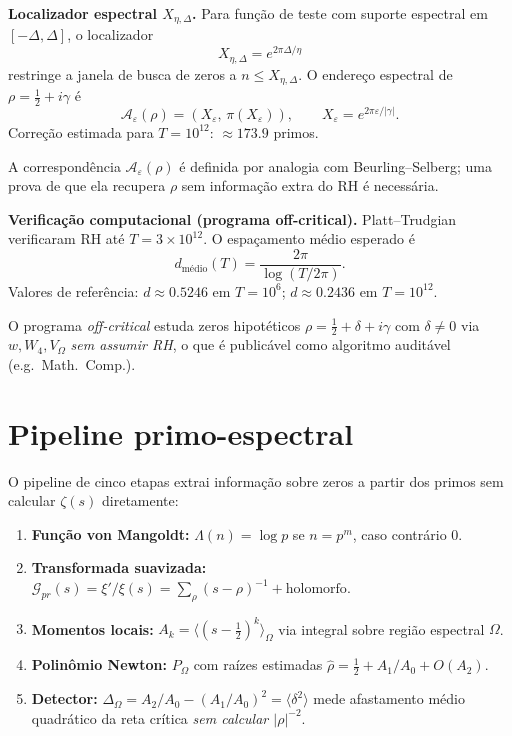 \documentclass[11pt,a4paper]{article}
\begin{document}
\begin{programs}
\item \textbf{Localizador espectral $X_{\eta,\Delta}$.}
Para função de teste com suporte espectral em $[-\Delta,\Delta]$,
o localizador
\[
  X_{\eta,\Delta}=e^{2\pi\Delta/\eta}
\]
restringe a janela de busca de zeros a $n\le X_{\eta,\Delta}$.
O endereço espectral de $\rho=\tfrac12+i\gamma$ é
\[
  \mathscr A_\varepsilon(\rho)=(X_\varepsilon,\,\pi(X_\varepsilon)),
  \qquad X_\varepsilon=e^{2\pi\varepsilon/|\gamma|}.
\]
Correção estimada para $T=10^{12}$: $\approx173.9$ primos.

\begin{gap}
A correspondência $\mathscr A_\varepsilon(\rho)$ é definida por analogia
com Beurling–Selberg; uma prova de que ela recupera $\rho$ sem
informação extra do RH é necessária. \OPEN
\end{gap}

\item \textbf{Verificação computacional (programa off-critical).}
Platt–Trudgian verificaram RH até $T=3\times10^{12}$.
O espaçamento médio esperado é
\[
  d_{\mathrm{médio}}(T)=\frac{2\pi}{\log(T/2\pi)}.
\]
Valores de referência: $d\approx0.5246$ em $T=10^6$;
$d\approx0.2436$ em $T=10^{12}$.

O programa \emph{off-critical} estuda zeros hipotéticos
$\rho=\tfrac12+\delta+i\gamma$ com $\delta\neq0$
via $w,W_4,V_\Omega$ \emph{sem assumir RH}, o que é
publicável como algoritmo auditável (e.g.\ Math.\ Comp.).

\end{programs}

\section{Pipeline primo-espectral}

O pipeline de cinco etapas extrai informação sobre zeros a partir
dos primos sem calcular $\zeta(s)$ diretamente:

\begin{enumerate}[leftmargin=2em]
\item \textbf{Função von Mangoldt:} $\Lambda(n)=\log p$ se $n=p^m$, caso contrário $0$.
\item \textbf{Transformada suavizada:}
  $\mathcal G_{pr}(s)=\xi'/\xi(s)=\sum_\rho(s-\rho)^{-1}+\text{holomorfo}$.
\item \textbf{Momentos locais:}
  $A_k = \langle (s-\tfrac12)^k \rangle_\Omega$
  via integral sobre região espectral $\Omega$.
\item \textbf{Polinômio Newton:} $P_\Omega$ com raízes estimadas
  $\hat\rho = \tfrac12 + A_1/A_0 + O(A_2)$.
\item \textbf{Detector:}
  $\Delta_\Omega = A_2/A_0 - (A_1/A_0)^2 = \langle\delta^2\rangle$
  mede afastamento médio quadrático da reta crítica
  \emph{sem calcular $|\rho|^{-2}$}.
\end{enumerate}
\end{document}

